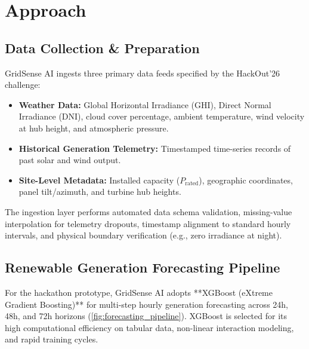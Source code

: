 \section{Approach}
\label{sec:approach}

\subsection{Data Collection \& Preparation}
\label{subsec:data_preparation}

GridSense AI ingests three primary data feeds specified by the HackOut'26 challenge:
\begin{itemize}[leftmargin=1.5em, itemsep=0.2em]
    \item \textbf{Weather Data:} Global Horizontal Irradiance (GHI), Direct Normal Irradiance (DNI), cloud cover percentage, ambient temperature, wind velocity at hub height, and atmospheric pressure.
    \item \textbf{Historical Generation Telemetry:} Timestamped time-series records of past solar and wind output.
    \item \textbf{Site-Level Metadata:} Installed capacity ($P_{\text{rated}}$), geographic coordinates, panel tilt/azimuth, and turbine hub heights.
\end{itemize}

The ingestion layer performs automated data schema validation, missing-value interpolation for telemetry dropouts, timestamp alignment to standard hourly intervals, and physical boundary verification (e.g., zero irradiance at night).

\subsection{Renewable Generation Forecasting Pipeline}
\label{subsec:forecasting_pipeline_sec}

For the hackathon prototype, GridSense AI adopts **XGBoost (eXtreme Gradient Boosting)** for multi-step hourly generation forecasting across 24h, 48h, and 72h horizons (\cref{fig:forecasting_pipeline}). XGBoost is selected for its high computational efficiency on tabular data, non-linear interaction modeling, and rapid training cycles.

